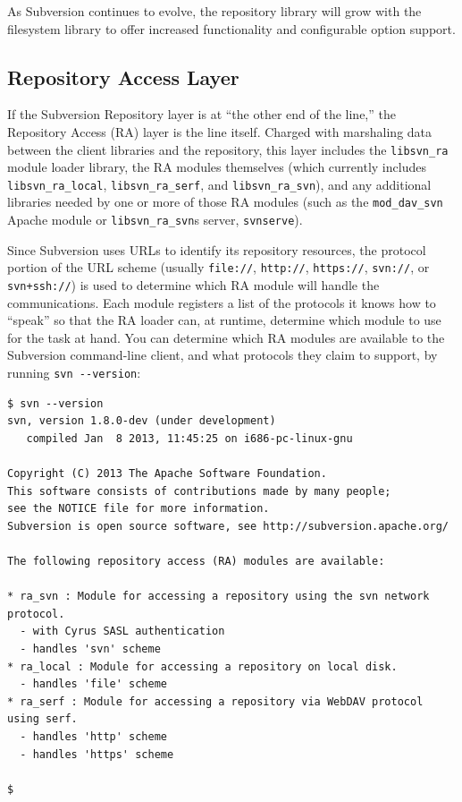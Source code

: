 As Subversion continues to evolve, the repository library will grow with
the filesystem library to offer increased functionality and configurable
option support.

\subsection{Repository Access Layer}\label{svn.developer.layerlib.ra}

If the Subversion Repository layer is at ``the other end of the line,''
the Repository Access (RA) layer is the line itself. Charged with
marshaling data between the client libraries and the repository, this
layer includes the \texttt{libsvn\_ra} module loader library, the RA
modules themselves (which currently includes \texttt{libsvn\_ra\_local},
\texttt{libsvn\_ra\_serf}, and \texttt{libsvn\_ra\_svn}), and any
additional libraries needed by one or more of those RA modules (such as
the \texttt{mod\_dav\_svn} Apache module or
\texttt{libsvn\_ra\_svn}\textquotesingle s server, \texttt{svnserve}).

Since Subversion uses URLs to identify its repository resources, the
protocol portion of the URL scheme (usually \texttt{file://},
\texttt{http://}, \texttt{https://}, \texttt{svn://}, or
\texttt{svn+ssh://}) is used to determine which RA module will handle
the communications. Each module registers a list of the protocols it
knows how to ``speak'' so that the RA loader can, at runtime, determine
which module to use for the task at hand. You can determine which RA
modules are available to the Subversion command-line client, and what
protocols they claim to support, by running \texttt{svn\ -\/-version}:

\begin{verbatim}
$ svn --version
svn, version 1.8.0-dev (under development)
   compiled Jan  8 2013, 11:45:25 on i686-pc-linux-gnu

Copyright (C) 2013 The Apache Software Foundation.
This software consists of contributions made by many people;
see the NOTICE file for more information.
Subversion is open source software, see http://subversion.apache.org/

The following repository access (RA) modules are available:

* ra_svn : Module for accessing a repository using the svn network protocol.
  - with Cyrus SASL authentication
  - handles 'svn' scheme
* ra_local : Module for accessing a repository on local disk.
  - handles 'file' scheme
* ra_serf : Module for accessing a repository via WebDAV protocol using serf.
  - handles 'http' scheme
  - handles 'https' scheme

$
\end{verbatim}

